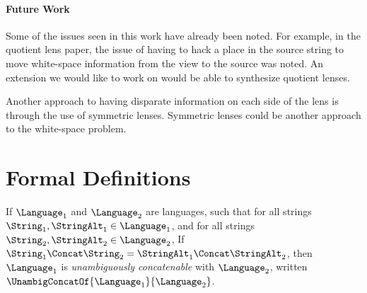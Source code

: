 \documentclass[sigplan,acmsmall]{acmart}
\begin{document}

\ifdraft
\paragraph*{Future Work}
Some of the issues seen in this work have already been noted.  For example, in the
quotient lens paper, the issue of having to hack a place in the source string to
move white-space information from the view to the source was noted.  An extension
we would like to work on would be able to synthesize quotient lenses.

Another approach to having disparate information on each side of the lens is
through the use of symmetric lenses.  Symmetric lenses could be another approach to the
white-space problem.

\fi


\appendix

\ifanon\else
\fi







\ifappendices



\onecolumn
\section{Formal Definitions}
\begin{definition}
  If $\Language_1$ and $\Language_2$ are languages, such that
  for all strings $\String_1,\StringAlt_1 \in \Language_1$, and for all strings
  $\String_2,\StringAlt_2 \in \Language_2$, If $\String_1\Concat\String_2 =
  \StringAlt_1\Concat\StringAlt_2$, then $\Language_1$ is \textit{unambiguously
    concatenable} with $\Language_2$, written
  $\UnambigConcatOf{\Language_1}{\Language_2}$.
\end{definition}
\end{document}
